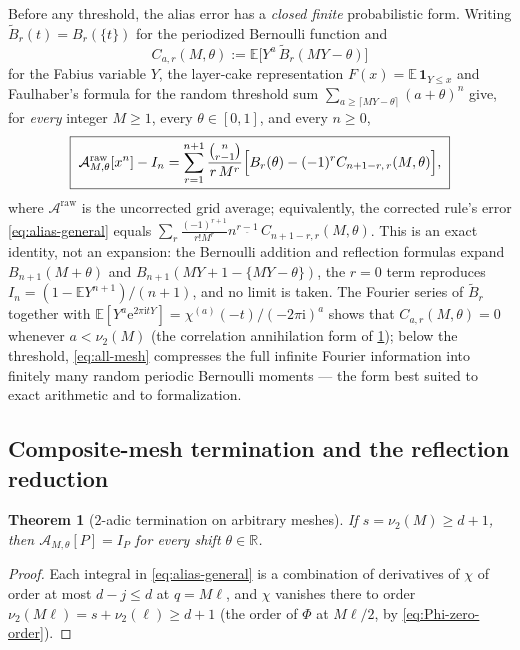 \documentclass[11pt,oneside]{article}
\numberwithin{equation}{section}
\newtheorem{theorem}{Theorem}[section]
\theoremstyle{definition}
\theoremstyle{remark}
\newcommand{\R}{\mathbb R}
\newcommand{\E}{\mathbb E}
\newcommand{\e}{\mathrm e}
\newcommand{\ii}{\mathrm i}
\newcommand{\vtwo}{\nu_2}
\newcommand{\fall}[2]{#1^{\underline{#2}}}
\begin{document}
Before any threshold, the alias error has a \emph{closed finite}
probabilistic form.  Writing $\widetilde B_r(t)=B_r(\{t\})$ for the
periodized Bernoulli function and
\begin{equation}
 C_{a,r}(M,\theta):=\E\bigl[Y^{a}\,\widetilde B_r(MY-\theta)\bigr]
 \label{eq:alias-correlation}
\end{equation}
for the Fabius variable $Y$, the layer-cake representation
$F(x)=\E\,\mathbf 1_{Y\le x}$ and Faulhaber's formula for the random
threshold sum $\sum_{a\ge\lceil MY-\theta\rceil}(a+\theta)^{n}$ give,
for \emph{every} integer $M\ge1$, every $\theta\in[0,1]$, and every
$n\ge0$,
\begin{equation}
 \boxed{\;
 \mathcal A^{\mathrm{raw}}_{M,\theta}[x^{n}]-I_n
 =\sum_{r=1}^{n+1}\frac{\binom n{r-1}}{r\,M^{r}}
 \Bigl[B_r(\theta)-(-1)^{r}C_{n+1-r,\,r}(M,\theta)\Bigr],\;}
 \label{eq:all-mesh}
\end{equation}
where $\mathcal A^{\mathrm{raw}}$ is the uncorrected grid average;
equivalently, the corrected rule's error \eqref{eq:alias-general} equals
$\sum_{r}\frac{(-1)^{r+1}}{r!M^{r}}\fall n{r-1}\,C_{n+1-r,r}(M,\theta)$.
This is an exact identity, not an expansion: the Bernoulli addition and
reflection formulas expand $B_{n+1}(M+\theta)$ and
$B_{n+1}(MY+1-\{MY-\theta\})$, the $r=0$ term reproduces
$I_n=(1-\E Y^{n+1})/(n+1)$, and no limit is taken.  The Fourier series
of $\widetilde B_r$ together with
$\E[Y^{a}\e^{2\pi\ii tY}]=\chi^{(a)}(-t)/(-2\pi\ii)^{a}$ shows that
$C_{a,r}(M,\theta)=0$ whenever $a<\vtwo(M)$ (the correlation
annihilation form of \cref{thm:composite-termination}); below the
threshold, \eqref{eq:all-mesh} compresses the full infinite Fourier
information into finitely many random periodic Bernoulli moments ---
the form best suited to exact arithmetic and to formalization.

\subsection{Composite-mesh termination and the reflection reduction}

\begin{theorem}[$2$-adic termination on arbitrary meshes]
\label{thm:composite-termination}
If $s=\vtwo(M)\ge d+1$, then
$\mathcal A_{M,\theta}[P]=I_P$ for \emph{every} shift $\theta\in\R$.
\end{theorem}

\begin{proof}
Each integral in \eqref{eq:alias-general} is a combination of
derivatives of $\chi$ of order at most $d-j\le d$ at $q=M\ell$, and
$\chi$ vanishes there to order $\vtwo(M\ell)=s+\vtwo(\ell)\ge d+1$ (the
order of $\Phi$ at $M\ell/2$, by \eqref{eq:Phi-zero-order}).
\end{proof}
\end{document}
